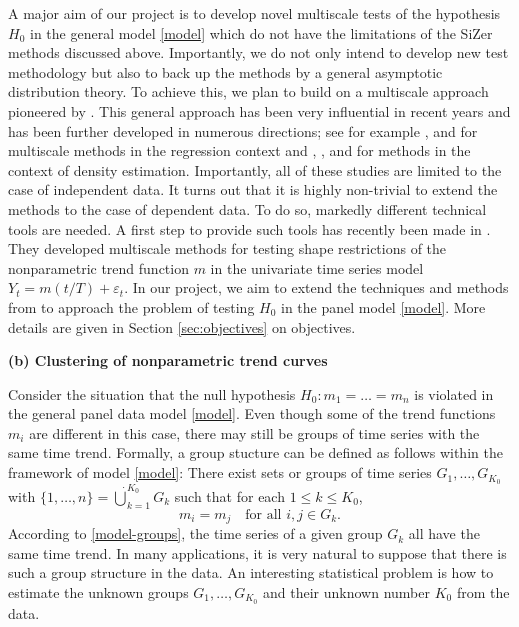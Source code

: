 \documentclass[a4paper,12pt]{article}
\begin{document}
A major aim of our project is to develop novel multiscale tests of the hypo\-thesis $H_0$ in the general model \eqref{model} which do not have the limitations of the SiZer methods discussed above. Importantly, we do not only intend to develop new test methodology but also to back up the methods by a general asymptotic distribution theory. To achieve this, we plan to build on a multiscale approach pioneered by \cite{DuembgenSpokoiny2001}. This general approach has been very influential in recent years and has been further developed in numerous directions; see for example \cite{Duembgen2002}, \cite{Rohde2008} and \cite{ProkschWernerMunk2018} for multiscale methods in the regression context and \cite{DuembgenWalther2008}, \cite{RufibachWalther2010}, \cite{SchmidtHieber2013} and \cite{EckleBissantzDette2017} for methods in the context of density estimation. Importantly, all of these studies are limited to the case of independent data. It turns out that it is highly non-trivial to extend the methods to the case of dependent data. To do so, markedly different technical tools are needed. A first step to provide such tools has recently been made in \cite{KhismatullinaVogt2018}. They developed multiscale methods for testing shape restrictions of the nonparametric trend function $m$ in the univariate time series model $Y_t = m(t/T) + \varepsilon_t$. In our project, we aim to extend the techniques and methods from \cite{KhismatullinaVogt2018} to approach the problem of testing $H_0$ in the panel model \eqref{model}. More details are given in Section \ref{sec:objectives} on objectives. 
\vspace{15pt}


\noindent \textbf{(b) Clustering of nonparametric trend curves} 
\vspace{10pt} 


\noindent Consider the situation that the null hypothesis $H_0: m_1 = \ldots = m_n$ is violated in the general panel data model \eqref{model}. 
Even though some of the trend functions $m_i$ are different in this case, there may still be groups of time series with the same time trend. Formally, a group stucture can be defined as follows within the framework of model \eqref{model}: There exist sets or groups of time series $G_1,\ldots,G_{K_0}$ with $\{1,\ldots,n\} = \dot\bigcup_{k=1}^{K_0} G_k$ such that for each $1 \le k \le K_0$, 
\begin{equation}\label{model-groups}
m_i = m_j \quad \text{for all } i,j \in G_k. 
\end{equation}
According to \eqref{model-groups}, the time series of a given group $G_k$ all have the same time trend. In many applications, it is very natural to suppose that there is such a group structure in the data. An interesting statistical problem is how to estimate the unknown groups $G_1,\ldots,G_{K_0}$ and their unknown number $K_0$ from the data. 
\end{document}
